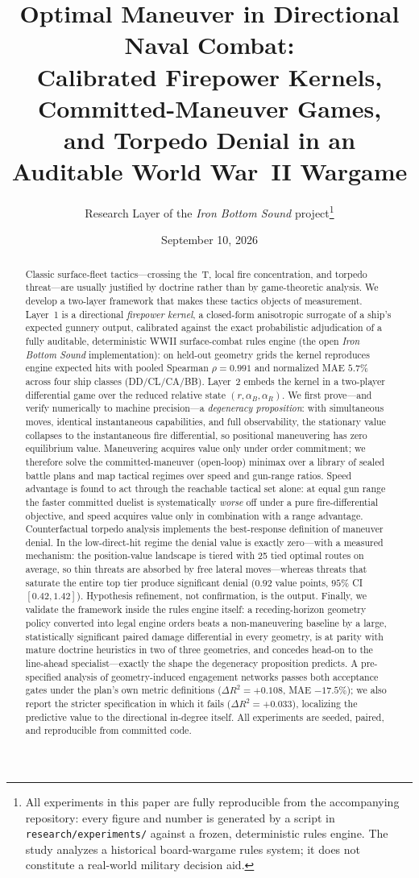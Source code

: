 \documentclass[12pt,a4paper]{article}
\title{Optimal Maneuver in Directional Naval Combat:\\
Calibrated Firepower Kernels, Committed-Maneuver Games,\\
and Torpedo Denial in an Auditable World War~II Wargame}
\author{Research Layer of the \emph{Iron Bottom Sound} project\thanks{All
experiments in this paper are fully reproducible from the accompanying
repository: every figure and number is generated by a script in
\texttt{research/experiments/} against a frozen, deterministic rules engine.
The study analyzes a historical board-wargame rules system; it does not
constitute a real-world military decision aid.}}
\date{September 10, 2026}
\begin{document}
\maketitle

\begin{abstract}
Classic surface-fleet tactics---crossing the~T, local fire concentration,
and torpedo threat---are usually justified by doctrine rather than by
game-theoretic analysis.  We develop a two-layer framework that makes these
tactics objects of measurement.  Layer~1 is a directional \emph{firepower
kernel}, a closed-form anisotropic surrogate of a ship's expected gunnery
output, calibrated against the exact probabilistic adjudication of a fully
auditable, deterministic WWII surface-combat rules engine (the open
\emph{Iron Bottom Sound} implementation): on held-out geometry grids the
kernel reproduces engine expected hits with pooled Spearman
$\rho=0.991$ and normalized MAE $5.7\%$ across four ship classes (DD/CL/CA/BB).  Layer~2 embeds the kernel in a two-player
differential game over the reduced relative state $(r,\alpha_B,\alpha_R)$.
We first prove---and verify numerically to machine precision---a
\emph{degeneracy proposition}: with simultaneous moves, identical
instantaneous capabilities, and full observability, the stationary value
collapses to the instantaneous fire differential, so positional maneuvering
has zero equilibrium value.  Maneuvering acquires value only under order
commitment; we therefore solve the committed-maneuver (open-loop) minimax
over a library of sealed battle plans and map tactical regimes over speed
and gun-range ratios.  Speed advantage is found to act
through the reachable tactical set alone: at equal gun range the faster
committed duelist is systematically \emph{worse} off under a pure
fire-differential objective, and speed acquires value only in combination
with a range advantage.
Counterfactual torpedo analysis implements the best-response definition of
maneuver denial.  In the low-direct-hit regime the denial value is exactly
zero---with a measured mechanism: the position-value landscape is tiered
with 25 tied optimal routes on average, so thin threats are absorbed by
free lateral moves---whereas threats that saturate the entire top tier
produce significant denial ($0.92$ value points, $95\%$ CI $[0.42,1.42]$).
Hypothesis refinement, not confirmation, is the output.  Finally, we validate the framework inside the rules engine
itself: a receding-horizon geometry policy converted into legal engine
orders beats a non-maneuvering baseline by a large, statistically
significant paired damage differential in every geometry, is at parity
with mature doctrine heuristics in two of three geometries, and concedes
head-on to the line-ahead specialist---exactly the shape the degeneracy
proposition predicts.  A pre-specified
analysis of geometry-induced engagement networks passes both acceptance
gates under the plan's own metric definitions ($\Delta R^2=+0.108$, MAE
$-17.5\%$); we also report the stricter specification in which it fails
($\Delta R^2=+0.033$), localizing the predictive value to the directional
in-degree itself.  All experiments are
seeded, paired, and reproducible from committed code.
\end{abstract}
\end{document}
